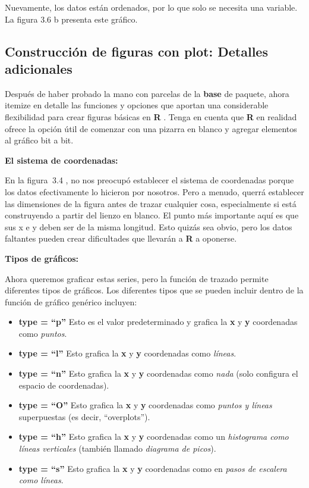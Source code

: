 \documentclass[
]{book}
\providecommand{\tightlist}{%
  \setlength{\itemsep}{0pt}\setlength{\parskip}{0pt}}
\begin{document}
Nuevamente, los datos están ordenados, por lo que solo se necesita una variable. La figura 3.6 b presenta este gráfico.

\hypertarget{construcciuxf3n-de-figuras-con-plot-detalles-adicionales}{%
\subsection*{\texorpdfstring{Construcción de figuras con \textbf{plot}: Detalles adicionales}{Construcción de figuras con plot: Detalles adicionales}}\label{construcciuxf3n-de-figuras-con-plot-detalles-adicionales}}

Después de haber probado la mano con parcelas de la \textbf{base} de paquete, ahora itemize en detalle las funciones y opciones que aportan una considerable flexibilidad para crear figuras básicas en \textbf{R} . Tenga en cuenta que \textbf{R} en realidad ofrece la opción útil de comenzar con una pizarra en blanco y agregar elementos al gráfico bit a bit.

\textbf{El sistema de coordenadas:}

En la figura  3.4 , no nos preocupó establecer el sistema de coordenadas porque los datos efectivamente lo hicieron por nosotros. Pero a menudo, querrá establecer las dimensiones de la figura antes de trazar cualquier cosa, especialmente si está construyendo a partir del lienzo en blanco. El punto más importante aquí es que sus x e y deben ser de la misma longitud. Esto quizás sea obvio, pero los datos faltantes pueden crear dificultades que llevarán a \textbf{R} a oponerse.

\textbf{Tipos de gráficos:}

Ahora queremos graficar estas series, pero la función de trazado permite diferentes tipos de gráficos. Los diferentes tipos que se pueden incluir dentro de la función de gráfico genérico incluyen:

\begin{itemize}
\tightlist
\item
  \textbf{type = ``p''} Esto es el valor predeterminado y grafica la \textbf{x} y \textbf{y} coordenadas como \emph{puntos}.
\item
  \textbf{type = ``l''} Esto grafica la \textbf{x} y \textbf{y} coordenadas como \emph{líneas}.
\item
  \textbf{type = ``n''} Esto grafica la \textbf{x} y \textbf{y} coordenadas como \emph{nada} (solo configura el espacio de coordenadas).
\item
  \textbf{type = ``O''} Esto grafica la \textbf{x} y \textbf{y} coordenadas como \emph{puntos y líneas} superpuestas (es decir, ``overplots'').
\item
  \textbf{type = ``h''} Esto grafica la \textbf{x} y \textbf{y} coordenadas como un \emph{histograma como líneas verticales} (también llamado \emph{diagrama de picos}).
\item
  \textbf{type = ``s''} Esto grafica la \textbf{x} y \textbf{y} coordenadas como en \emph{pasos de escalera como líneas}.
\end{itemize}
\end{document}
